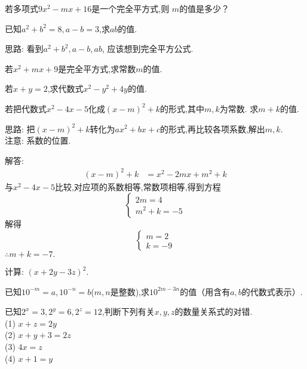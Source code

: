 \item{
    若多项式$ 9x^2 - mx+16$是一个完全平方式,则 $m$的值是多少？
}
\item{
    已知$a^2+b^2=8, a-b=3$,求$ab$的值.

    \fangsong{}
    思路: 看到$a^2+b^2, a-b, ab$, 应该想到完全平方公式.
}
\item{
    若$x^2+mx+9$是完全平方式,求常数$m$的值.
}
\item{
    若$x+y=2$,求代数式$x^2-y^2+4y$的值.
}
\item{
    若把代数式$x^2-4x-5$化成$(x-m)^2+k$的形式,其中$m,k$为常数. 求$m+k$的值.

    \fangsong{}
    思路: 把$(x-m)^2+k$转化为$ax^2+bx+c$的形式,再比较各项系数,解出$m,k$.\\
    注意: 系数的位置.

    解答: 
    \begin{align*}
        (x-m)^2+k &= x^2-2mx+m^2+k
    \end{align*}
    与$x^2-4x-5$比较,对应项的系数相等,常数项相等,得到方程
    \[\left\{ 
        \begin{array}{lc}
            2m = 4\\
            m^2+k=-5
        \end{array}
    \right.\]
    解得
    \[\left\{ 
        \begin{array}{lc}
            m = 2\\
            k =-9
        \end{array}
    \right.\]
    $\therefore m+k=-7.$
}
\item{
    计算: $(x+2y-3z)^2$.
}
\item{
    已知$10^{-m}=a, 10^{-n}=b$($m, n$是整数),求$10^{2m-3n}$的值（用含有$a, b$的代数式表示）.
}
\item{
    已知$2^x=3, 2^y=6, 2^z=12$,判断下列有关$x, y, z$的数量关系式的对错.\\
    (1) $x+z=2y$\\
    (2) $x+y+3=2z$\\
    (3) $4x=z$\\
    (4) $x+1=y$
}
